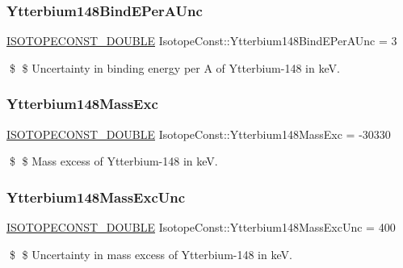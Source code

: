 \subsubsection{\texorpdfstring{Ytterbium148\+Bind\+E\+Per\+A\+Unc}{Ytterbium148BindEPerAUnc}}
{\footnotesize\ttfamily \mbox{\hyperlink{group___isotope_const-_macros_ga8f45a7272ce02c0b4c65c44636ed719a}{I\+S\+O\+T\+O\+P\+E\+C\+O\+N\+S\+T\+\_\+\+D\+O\+U\+B\+LE}} Isotope\+Const\+::\+Ytterbium148\+Bind\+E\+Per\+A\+Unc = 3}

\$ \$ Uncertainty in binding energy per A of Ytterbium-\/148 in keV. \mbox{\label{group___isotope_const-_ytterbium-_yb148_ga7f71fccbdb23c6a511ac8129c88ec805}} 
\subsubsection{\texorpdfstring{Ytterbium148\+Mass\+Exc}{Ytterbium148MassExc}}
{\footnotesize\ttfamily \mbox{\hyperlink{group___isotope_const-_macros_ga8f45a7272ce02c0b4c65c44636ed719a}{I\+S\+O\+T\+O\+P\+E\+C\+O\+N\+S\+T\+\_\+\+D\+O\+U\+B\+LE}} Isotope\+Const\+::\+Ytterbium148\+Mass\+Exc = -\/30330}

\$ \$ Mass excess of Ytterbium-\/148 in keV. \mbox{\label{group___isotope_const-_ytterbium-_yb148_gaffa6a513ac6b3828ca9cf69ba44d9f2d}} 
\subsubsection{\texorpdfstring{Ytterbium148\+Mass\+Exc\+Unc}{Ytterbium148MassExcUnc}}
{\footnotesize\ttfamily \mbox{\hyperlink{group___isotope_const-_macros_ga8f45a7272ce02c0b4c65c44636ed719a}{I\+S\+O\+T\+O\+P\+E\+C\+O\+N\+S\+T\+\_\+\+D\+O\+U\+B\+LE}} Isotope\+Const\+::\+Ytterbium148\+Mass\+Exc\+Unc = 400}

\$ \$ Uncertainty in mass excess of Ytterbium-\/148 in keV. \mbox{\label{group___isotope_const-_ytterbium-_yb148_gaeee5522df35c4a23f35978f6541b979e}} 

